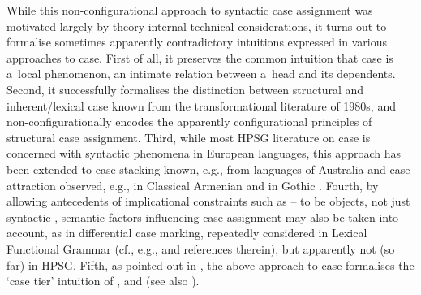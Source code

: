 \documentclass[output=paper]{langsci/langscibook}
\begin{document}
While this non-configurational approach to syntactic case assignment was motivated largely by theory-internal technical considerations, it turns out to formalise sometimes apparently contradictory intuitions expressed in various approaches to case.  First of all, it preserves the common intuition that case is a~local phenomenon, an intimate relation between a~head and its dependents.  Second, it successfully formalises the distinction between structural and inherent/lexical case known from the transformational literature of 1980s, and non-configurationally encodes the apparently configurational principles of structural case assignment.  Third, while most HPSG literature on case is concerned with syntactic phenomena in European languages, this approach has been extended to case stacking known, e.g., from languages of Australia and case attraction observed, e.g., in Classical Armenian and in Gothic \citep{malo:00}.  Fourth, by allowing antecedents of implicational constraints such as – to be  objects, not just syntactic , semantic factors influencing case assignment may also be taken into account, as in differential case marking, repeatedly considered in Lexical Functional Grammar (cf., e.g., \citealt{BHK2003a-u} and references therein), but apparently not (so far) in HPSG\@.  Fifth, as pointed out in \citealt{Prze99,Prze99b}, the above approach to case formalises the `case tier’ intuition of \citealt{ZMT85a}, \citealt{YMJ87} and \citealt{mali:93} (see also \citealt{mali:09}).
\end{document}
